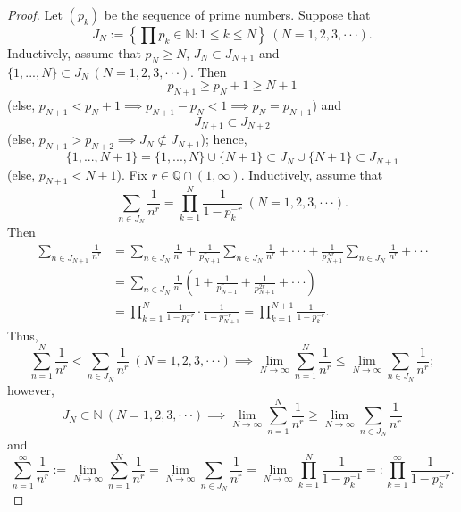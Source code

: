 \documentclass{amsart}
\theoremstyle{definition}
\begin{document}
\begin{proof}
    Let $(p_k)$ be the sequence of prime numbers. Suppose that 
    \[
    J_N := \left\{\prod p_k \in \mathbb{N} : 1 \leq k \leq N\right\} \ (N = 1,2,3,\cdot \cdot \cdot).
    \]
    Inductively, assume that $p_N \geq N$, $J_N \subset J_{N+1}$ and $\{1,...,N\} \subset J_{N} \ (N = 1,2,3,\cdot \cdot \cdot)$. Then 
    \[
    p_{N+1} \geq p_N + 1 \geq N + 1
    \]
    (else, $p_{N+1} < p_{N} + 1 \implies p_{N+1}-p_{N} < 1 \implies p_N = p_{N+1}$)
    and 
    \[
    J_{N+1} \subset J_{N+2}
    \]
    (else, $p_{N+1} > p_{N+2} \implies J_{N} \not \subset J_{N+1}$); hence,
    \[
    \{1,...,N+1\} = \{1,...,N\} \cup \{N+1\} \subset J_N \cup \{N+1\} \subset J_{N+1}
    \]
    (else, $p_{N+1} < N+1$). Fix $r \in \mathbb{Q} \cap (1,\infty)$. Inductively, assume that
    \[
    \sum_{n \in J_N}\frac{1}{n^r} = \prod_{k=1}^{N}\frac{1}{1-p_k^{-r}} \ (N = 1,2,3,\cdot \cdot \cdot).
    \]
    Then 
    \begin{align*}
        \sum_{n \in J_{N+1}}\frac{1}{n^r} &= \sum_{n \in J_N}\frac{1}{n^r} + \frac{1}{p_{N+1}^r}\sum_{n \in J_N}\frac{1}{n^r} + \cdot \cdot \cdot + \frac{1}{p_{N+1}^{Nr}}\sum_{n \in J_N}\frac{1}{n^r} + \cdot \cdot \cdot \\
        &= \sum_{n \in J_{N}}\frac{1}{n^r}\left(1 + \frac{1}{p_{N+1}^r} + \frac{1}{p_{N+1}^{2r}} + \cdot \cdot \cdot\right) \\
        &= \prod_{k=1}^{N}\frac{1}{1-p_k^{-r}} \cdot \frac{1}{1-p_{N+1}^{-r}} = \prod_{k=1}^{N+1}\frac{1}{1-p_k^{-r}}.
    \end{align*}
    Thus,
    \[
    \sum_{n=1}^{N}\frac{1}{n^r} < \sum_{n \in J_{N}}\frac{1}{n^r} \ (N = 1,2,3,\cdot \cdot \cdot) \implies \lim_{N \to \infty}\sum_{n=1}^{N}\frac{1}{n^r} \leq \lim_{N \to \infty}\sum_{n \in J_N}\frac{1}{n^r};
    \]
    however, 
    \[
    J_N \subset \mathbb{N} \ (N = 1,2,3,\cdot \cdot \cdot) \implies \lim_{N \to \infty}\sum_{n=1}^{N}\frac{1}{n^r} \geq \lim_{N \to \infty}\sum_{n \in J_N}\frac{1}{n^r}
    \]
    and 
    \[
    \sum_{n=1}^{\infty}\frac{1}{n^r} := \lim_{N \to \infty}\sum_{n=1}^{N}\frac{1}{n^r} = \lim_{N \to \infty}\sum_{n \in J_{N}}\frac{1}{n^r} = \lim_{N \to \infty}\prod_{k=1}^{N}\frac{1}{1-p_k^{-1}} =: \prod_{k=1}^{\infty}\frac{1}{1-p_k^{-r}}.
    \]
    
\end{proof}
\end{document}
